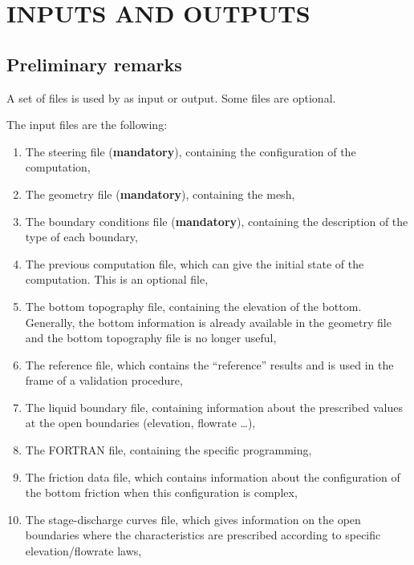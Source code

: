 
\chapter{  INPUTS AND OUTPUTS}
\label{ch:inp:outp}

\section{Preliminary remarks}

 A set of files is used by  as input or output. Some files are optional.

 The input files are the following:

\begin{enumerate}
\item  The steering file (\textbf{mandatory}), containing the configuration of the computation,

\item  The geometry file (\textbf{mandatory}), containing the mesh,

\item  The boundary conditions file (\textbf{mandatory}), containing the description of the type of each boundary,

\item  The previous computation file, which can give the initial state of the computation. This is an optional file,

\item  The bottom topography file, containing the elevation of the bottom. Generally, the bottom information is already available in the geometry file and the bottom topography file is no longer useful,

\item  The reference file, which contains the ``reference'' results and is used in the frame of a validation procedure,

\item  The liquid boundary file, containing information about the prescribed values at the open boundaries (elevation, flowrate {\dots}),

\item  The FORTRAN file, containing the specific programming,

\item  The friction data file, which contains information about the configuration of the bottom friction when this configuration is complex,

\item  The stage-discharge curves file, which gives information on the open boundaries where the characteristics are prescribed according to specific elevation/flowrate laws,


\end{enumerate}
